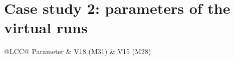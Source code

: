 \section{Case study 2: parameters of the virtual runs}\label{app:c2}

\begin{table}[width=\linewidth,cols=3,pos=h]
\caption{Parameters of the generating mechanisms of the virtual runs: M31 calibrated to run BC18 (V18) and M28 calibrated to run BC15 (V15). Both are calibrations of the individual runs with the noise levels profiled out (Section~\ref{sec:c2:real}).}\label{tab:c2virtualpar}
\begin{tabular*}{\tblwidth}{@{}LCC@{}}
\toprule
Parameter & V18 (M31) & V15 (M28) \\
\midrule
{}
\bottomrule
\end{tabular*}
\end{table}
